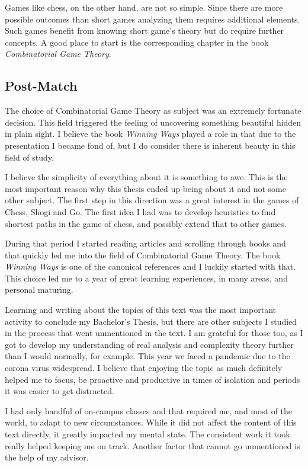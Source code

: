 Games like chess, on the other hand, are not so simple. Since there are more possible outcomes than short games analyzing them requires additional elements. Such games benefit from knowing short game's theory but do require further concepts. A good place to start is the corresponding chapter in the book \textit{Combinatorial Game Theory}.


\subsection*{Post-Match}

The choice of Combinatorial Game Theory as subject was an extremely fortunate decision. This field triggered the feeling of uncovering something beautiful hidden in plain sight. I believe the book \textit{Winning Ways} played a role in that due to the presentation I became fond of, but I do consider there is inherent beauty in this field of study.

I believe the simplicity of everything about it is something to awe. This is the most important reason why this thesis ended up being about it and not some other subject. The first step in this direction was a great interest in the games of Chess, Shogi and Go. The first idea I had was to develop heuristics to find shortest paths in the game of chess, and possibly extend that to other games.

During that period I started reading articles and scrolling through books and that quickly led me into the field of Combinatorial Game Theory. The book \textit{Winning Ways} is one of the canonical references and I luckily started with that. This choice led me to a year of great learning experiences, in many areas, and personal maturing.

Learning and writing about the topics of this text was the most important activity to conclude my Bachelor's Thesis, but there are other subjects I studied in the process that went unmentioned in the text. I am grateful for those too, as I got to develop my understanding of real analysis and complexity theory further than I would normally, for example. This year we faced a pandemic due to the corona virus widespread. I believe that enjoying the topic as much definitely helped me to focus, be proactive and productive in times of isolation and periods it was easier to get distracted. 

I had only handful of on-campus classes and that required me, and most of the world, to adapt to new circumstances. While it did not affect the content of this text directly, it greatly impacted my mental state. The consistent work it took really helped keeping me on track. Another factor that cannot go unmentioned is the help of my advisor.

